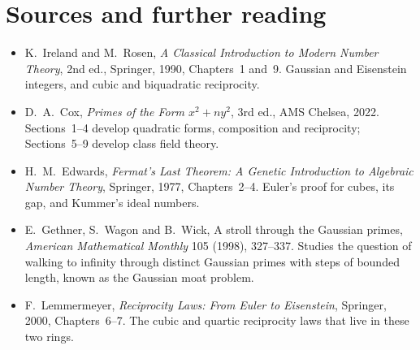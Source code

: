 \section*{Sources and further reading}

\begin{itemize}
\item K.~Ireland and M.~Rosen, \emph{A Classical Introduction to Modern Number Theory}, 2nd ed., Springer, 1990, Chapters~1 and~9. Gaussian and Eisenstein integers, and cubic and biquadratic reciprocity.
\item D.~A.~Cox, \emph{Primes of the Form $x^2+ny^2$}, 3rd ed., AMS Chelsea, 2022. Sections~1--4 develop quadratic forms, composition and reciprocity; Sections~5--9 develop class field theory.
\item H.~M.~Edwards, \emph{Fermat's Last Theorem: A Genetic Introduction to Algebraic Number Theory}, Springer, 1977, Chapters~2--4. Euler's proof for cubes, its gap, and Kummer's ideal numbers.
\item E.~Gethner, S.~Wagon and B.~Wick, A stroll through the Gaussian primes, \emph{American Mathematical Monthly} 105 (1998), 327--337. Studies the question of walking to infinity through distinct Gaussian primes with steps of bounded length, known as the Gaussian moat problem.
\item F.~Lemmermeyer, \emph{Reciprocity Laws: From Euler to Eisenstein}, Springer, 2000, Chapters~6--7. The cubic and quartic reciprocity laws that live in these two rings.
\end{itemize}
